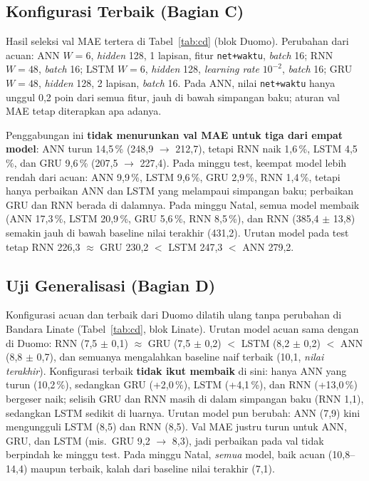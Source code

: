 \documentclass[conference,a4paper]{IEEEtran}
\begin{document}
\subsection{Konfigurasi Terbaik (Bagian C)}
Hasil seleksi val MAE tertera di Tabel~\ref{tab:cd} (blok Duomo). Perubahan dari acuan: ANN $W=6$, \textit{hidden} 128, 1 lapisan, fitur \texttt{net+waktu}, \textit{batch} 16; RNN $W=48$, \textit{batch} 16; LSTM $W=6$, \textit{hidden} 128, \textit{learning rate} $10^{-2}$, \textit{batch} 16; GRU $W=48$, \textit{hidden} 128, 2 lapisan, \textit{batch} 16. Pada ANN, nilai \texttt{net+waktu} hanya unggul 0,2 poin dari semua fitur, jauh di bawah simpangan baku; aturan val MAE tetap diterapkan apa adanya.

Penggabungan ini \textbf{tidak menurunkan val MAE untuk tiga dari empat model}: ANN turun 14,5\,\% (248,9 $\rightarrow$ 212,7), tetapi RNN naik 1,6\,\%, LSTM 4,5\,\%, dan GRU 9,6\,\% (207,5 $\rightarrow$ 227,4). Pada minggu test, keempat model lebih rendah dari acuan: ANN 9,9\,\%, LSTM 9,6\,\%, GRU 2,9\,\%, RNN 1,4\,\%, tetapi hanya perbaikan ANN dan LSTM yang melampaui simpangan baku; perbaikan GRU dan RNN berada di dalamnya. Pada minggu Natal, semua model membaik (ANN 17,3\,\%, LSTM 20,9\,\%, GRU 5,6\,\%, RNN 8,5\,\%), dan RNN (385,4 $\pm$ 13,8) semakin jauh di bawah baseline nilai terakhir (431,2). Urutan model pada test tetap RNN 226,3 $\approx$ GRU 230,2 $<$ LSTM 247,3 $<$ ANN 279,2.

\subsection{Uji Generalisasi (Bagian D)}
Konfigurasi acuan dan terbaik dari Duomo dilatih ulang tanpa perubahan di Bandara Linate (Tabel~\ref{tab:cd}, blok Linate). Urutan model acuan sama dengan di Duomo: RNN (7,5 $\pm$ 0,1) $\approx$ GRU (7,5 $\pm$ 0,2) $<$ LSTM (8,2 $\pm$ 0,2) $<$ ANN (8,8 $\pm$ 0,7), dan semuanya mengalahkan baseline naif terbaik (10,1, \emph{nilai terakhir}). Konfigurasi terbaik \textbf{tidak ikut membaik} di sini: hanya ANN yang turun (10,2\,\%), sedangkan GRU (+2,0\,\%), LSTM (+4,1\,\%), dan RNN (+13,0\,\%) bergeser naik; selisih GRU dan RNN masih di dalam simpangan baku (RNN 1,1), sedangkan LSTM sedikit di luarnya. Urutan model pun berubah: ANN (7,9) kini mengungguli LSTM (8,5) dan RNN (8,5). Val MAE justru turun untuk ANN, GRU, dan LSTM (mis.\ GRU 9,2 $\rightarrow$ 8,3), jadi perbaikan pada val tidak berpindah ke minggu test. Pada minggu Natal, \emph{semua} model, baik acuan (10,8--14,4) maupun terbaik, kalah dari baseline nilai terakhir (7,1).
\end{document}
